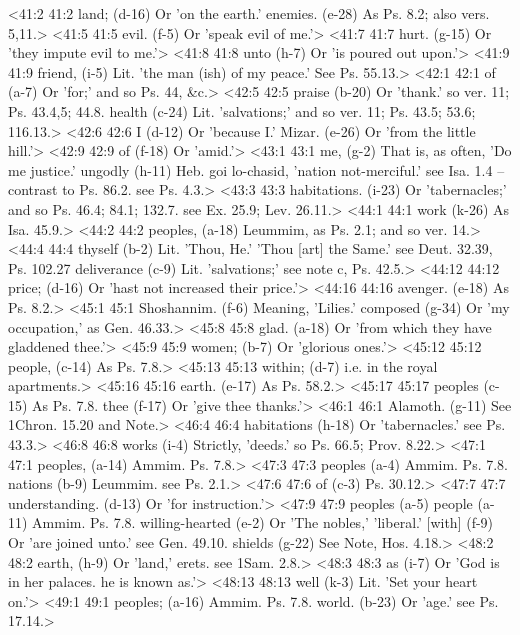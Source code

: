 <41:2 41:2  land; (d-16)  Or 'on the earth.'
  enemies. (e-28)  As Ps. 8.2; also vers. 5,11.>
<41:5 41:5  evil. (f-5)  Or 'speak evil of me.'>
<41:7 41:7  hurt. (g-15)  Or 'they impute evil to me.'>
<41:8 41:8  unto (h-7)  Or 'is poured out upon.'>
<41:9 41:9  friend, (i-5)  Lit. 'the man (ish) of my peace.' See Ps. 55.13.>
<42:1 42:1  of (a-7)  Or 'for;' and so Ps. 44, &c.>
<42:5 42:5  praise (b-20)  Or 'thank.' so ver. 11; Ps. 43.4,5; 44.8.
  health (c-24)  Lit. 'salvations;' and so ver. 11; Ps. 43.5; 53.6; 116.13.>
<42:6 42:6  I (d-12)  Or 'because I.'
  Mizar. (e-26)  Or 'from the little hill.'>
<42:9 42:9  of (f-18)  Or 'amid.'>
<43:1 43:1  me, (g-2)  That is, as often, 'Do me justice.'
  ungodly (h-11)  Heb. goi lo-chasid, 'nation not-merciful.' see Isa. 1.4 --  contrast to Ps. 86.2. see Ps. 4.3.>
<43:3 43:3  habitations. (i-23)  Or 'tabernacles;' and so Ps. 46.4; 84.1; 132.7. see Ex. 25.9;  Lev. 26.11.>
<44:1 44:1  work (k-26)  As Isa. 45.9.>
<44:2 44:2  peoples, (a-18)  Leummim, as Ps. 2.1; and so ver. 14.>
<44:4 44:4  thyself (b-2)  Lit. 'Thou, He.' 'Thou [art] the Same.' see Deut. 32.39, Ps. 102.27
  deliverance (c-9)  Lit. 'salvations;' see note c, Ps. 42.5.>
<44:12 44:12  price; (d-16)  Or 'hast not increased their price.'>
<44:16 44:16  avenger. (e-18)  As Ps. 8.2.>
<45:1 45:1  Shoshannim. (f-6)  Meaning, 'Lilies.'
  composed (g-34)  Or 'my occupation,' as Gen. 46.33.>
<45:8 45:8  glad. (a-18)  Or 'from which they have gladdened thee.'>
<45:9 45:9  women; (b-7)  Or 'glorious ones.'>
<45:12 45:12  people, (c-14)  As Ps. 7.8.>
<45:13 45:13  within; (d-7)  i.e. in the royal apartments.>
<45:16 45:16  earth. (e-17)  As Ps. 58.2.>
<45:17 45:17  peoples (c-15)  As Ps. 7.8.
  thee (f-17)  Or 'give thee thanks.'>
<46:1 46:1  Alamoth. (g-11)  See 1Chron. 15.20 and Note.>
<46:4 46:4  habitations (h-18)  Or 'tabernacles.' see Ps. 43.3.>
<46:8 46:8  works (i-4)  Strictly, 'deeds.' so Ps. 66.5; Prov. 8.22.>
<47:1 47:1  peoples, (a-14) Ammim. Ps. 7.8.>
<47:3 47:3  peoples (a-4) Ammim. Ps. 7.8.
  nations (b-9)  Leummim. see Ps. 2.1.>
<47:6 47:6  of (c-3)  Ps. 30.12.>
<47:7 47:7  understanding. (d-13)  Or 'for instruction.'>
<47:9 47:9  peoples (a-5)  people (a-11)
  Ammim. Ps. 7.8.
  willing-hearted (e-2)  Or 'The nobles,' 'liberal.'
  [with] (f-9)  Or 'are joined unto.' see Gen. 49.10.
  shields (g-22)  See Note, Hos. 4.18.>
<48:2 48:2  earth, (h-9)  Or 'land,' erets. see 1Sam. 2.8.>
<48:3 48:3  as (i-7)  Or 'God is in her palaces. he is known as.'>
<48:13 48:13  well (k-3)  Lit. 'Set your heart on.'>
<49:1 49:1  peoples; (a-16)  Ammim. Ps. 7.8.
  world. (b-23)  Or 'age.' see Ps. 17.14.>
